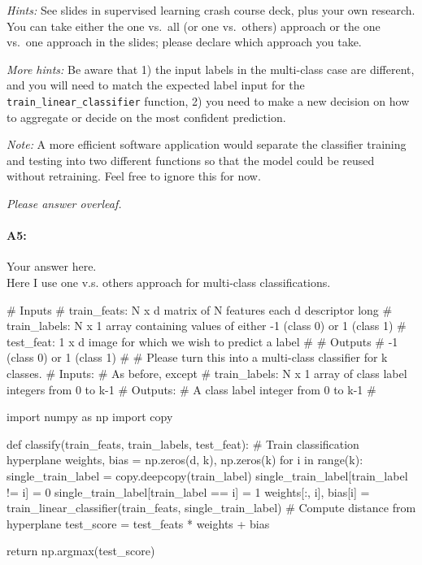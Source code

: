 \emph{Hints:} See slides in supervised learning crash course deck, plus your own research. You can take either the one vs.~all (or one vs.~others) approach or the one vs.~one approach in the slides; please declare which approach you take.

\emph{More hints:} Be aware that 1) the input labels in the multi-class case are different, and you will need to match the expected label input for the \texttt{train\_linear\_classifier} function, 2) you need to make a new decision on how to aggregate or decide on the most confident prediction.

\emph{Note:} A more efficient software application would separate the classifier training and testing into two different functions so that the model could be reused without retraining. Feel free to ignore this for now.

\emph{Please answer overleaf.}

\pagebreak
\paragraph{A5:} Your answer here. \\
Here I use one v.s. others approach for multi-class classifications.
\begin{python}
    # Inputs
    #   train_feats: N x d matrix of N features each d descriptor long
    #   train_labels: N x 1 array containing values of either -1 (class 0) or 1 (class 1)
    #   test_feat: 1 x d image for which we wish to predict a label
    #
    # Outputs
    #   -1 (class 0) or 1 (class 1)
    #
    # Please turn this into a multi-class classifier for k classes.
    # Inputs:
    #    As before, except
    #    train_labels: N x 1 array of class label integers from 0 to k-1
    # Outputs:
    #    A class label integer from 0 to k-1
    #

    import numpy as np
    import copy

    def classify(train_feats, train_labels, test_feat):
    # Train classification hyperplane
    weights, bias = np.zeros(d, k), np.zeros(k)
    for i in range(k):
        single_train_label = copy.deepcopy(train_label)
        single_train_label[train_label != i] = 0
        single_train_label[train_label == i] = 1
        weights[:, i], bias[i] = train_linear_classifier(train_feats, single_train_label)
    # Compute distance from hyperplane
    test_score = test_feats * weights + bias

    return np.argmax(test_score)
\end{python}


